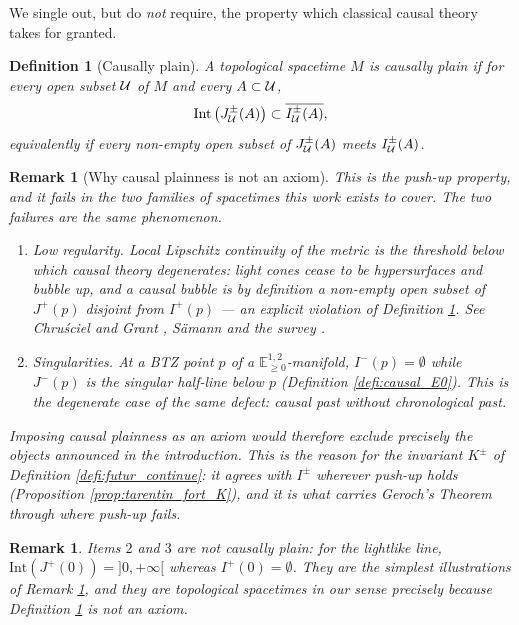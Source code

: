 \documentclass[a4paper,twoside]{article}
\newcommand{\mass}[1]{\mathbb{E}^{1,2}_{#1}}
\newtheorem{defi}[lem]{Definition}
\newtheorem{rem}[lem]{Remark}
\begin{document}
We single out, but do \emph{not} require, the property which classical causal theory takes for granted.

\begin{defi}[Causally plain]\label{defi:causalement_plat}
A topological spacetime $M$ is \emph{causally plain} if for every open subset $\mathcal{U}$ of $M$ and every $A\subset \mathcal{U}$,
$$\mathrm{Int}\left(J^\pm_{\mathcal{U}}(A)\right)\subset \overline{I^\pm_{\mathcal{U}}(A)},$$
equivalently if every non-empty open subset of $J^\pm_{\mathcal{U}}(A)$ meets $I^\pm_{\mathcal{U}}(A)$.
\end{defi}

\begin{rem}[Why causal plainness is not an axiom]\label{rem:pas_plat}
This is the \emph{push-up} property, and it fails in the two families of spacetimes this work exists to cover. The two failures are the same phenomenon.

\begin{enumerate}[label=(\roman*)]
\item \emph{Low regularity.} Local Lipschitz continuity of the metric is the threshold below which causal theory degenerates: light cones cease to be hypersurfaces and \emph{bubble up}, and a \emph{causal bubble} is by definition a non-empty open subset of $J^+(p)$ disjoint from $I^+(p)$ --- an explicit violation of Definition \ref{defi:causalement_plat}. See Chru\'sciel and Grant \cite{MR2949547}, S\"amann \cite{MR3500220} and the survey \cite{samann2024nonregular}.
\item \emph{Singularities.} At a BTZ point $p$ of a $\mass{\geq0}$-manifold, $I^-(p)=\emptyset$ while $J^-(p)$ is the singular half-line below $p$ (Definition \ref{defi:causal_E0}). This is the degenerate case of the same defect: causal past without chronological past.
\end{enumerate}

Imposing causal plainness as an axiom would therefore exclude precisely the objects announced in the introduction. This is the reason for the invariant $K^\pm$ of Definition \ref{defi:futur_continue}: it agrees with $I^\pm$ wherever push-up holds (Proposition \ref{prop:tarentin_fort_K}), and it is what carries Geroch's Theorem through where push-up fails.
\end{rem}
\begin{rem}\label{rem:droites_pas_plates}
Items $2$ and $3$ are not causally plain: for the lightlike line, $\mathrm{Int}\left(J^+(0)\right)=]0,+\infty[$ whereas $I^+(0)=\emptyset$. They are the simplest illustrations of Remark \ref{rem:pas_plat}, and they are topological spacetimes in our sense precisely because Definition \ref{defi:causalement_plat} is not an axiom.
		\end{rem}
\end{document}
